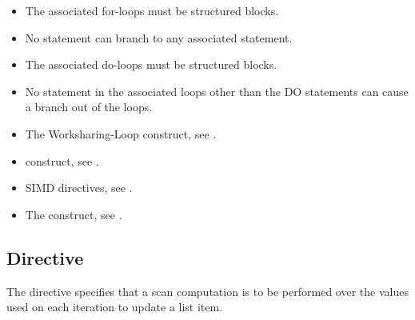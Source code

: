 \begin{ccppspecific}
\begin{itemize}

  \item The associated for-loops must be structured blocks.

  \item No statement can branch to any associated  statement.

\end{itemize}

\end{ccppspecific}

\begin{fortranspecific}
\begin{itemize}

  \item The associated do-loops must be structured blocks.

  \item No statement in the associated loops other than the DO statements can cause
    a branch out of the loops.


\end{itemize}
\end{fortranspecific}

\crossreferences
\begin{itemize}
  \item The Worksharing-Loop construct, see .

  \item {} construct, see .

  \item SIMD directives, see .

  \item The  construct, see .

\end{itemize}



\subsection{ Directive}
\label{subsec:scan Directive}

\summary
The  directive specifies that a scan computation is to be performed over the
values used on each iteration to update a list item.

